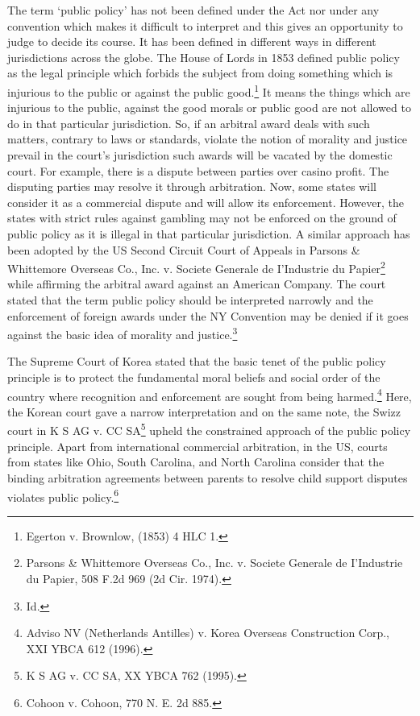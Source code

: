 \begin{multicols}{2}

\vspace{-.1cm}

\noi
The term ‘public policy’ has not been defined under the Act nor under any convention which
makes it difficult to interpret and this gives an opportunity to judge to decide its course. It has
been defined in different ways in different jurisdictions across the globe. The House of Lords
in 1853 defined public policy as the legal principle which forbids the subject from doing
something which is injurious to the public or against the public good.\footnote{Egerton v. Brownlow, (1853) 4 HLC 1.} It means the things which are injurious to the public, against the good morals or public good are not allowed to do in that particular jurisdiction. So, if an arbitral award deals with such matters, contrary to laws or standards, violate the notion of morality and justice prevail in the court’s jurisdiction
such awards will be vacated by the domestic court. For example, there is a dispute between
parties over casino profit. The disputing parties may resolve it through arbitration. Now, some
states will consider it as a commercial dispute and will allow its enforcement. However, the
states with strict rules against gambling may not be enforced on the ground of public policy
as it is illegal in that particular jurisdiction. A similar approach has been adopted by the US
Second Circuit Court of Appeals in Parsons \& Whittemore Overseas Co., Inc. v. Societe
Generale de I’Industrie du Papier\footnote{Parsons \& Whittemore Overseas Co., Inc. v. Societe Generale de I’Industrie du Papier, 508 F.2d 969 (2d Cir. 1974).} while affirming the arbitral award against an American Company. The court stated that the term public policy should be interpreted narrowly and the enforcement of foreign awards under the NY Convention may be denied if it goes against the basic idea of morality and justice.\footnote{Id.}

\vspace{-.1cm}

\noi
The Supreme Court of Korea stated that the basic tenet of the public policy principle is to
protect the fundamental moral beliefs and social order of the country where recognition and
enforcement are sought from being harmed.\footnote{Adviso NV (Netherlands Antilles) v. Korea Overseas Construction Corp., XXI YBCA 612 (1996).} Here, the Korean court gave a narrow
interpretation and on the same note, the Swizz court in K S AG v. CC SA\footnote{K S AG v. CC SA, XX YBCA 762 (1995).} upheld the constrained approach of the public policy principle. Apart from international commercial arbitration, in the US, courts from states like Ohio, South Carolina, and North Carolina consider that the binding arbitration agreements between parents to resolve child support disputes violates public policy.\footnote{Cohoon v. Cohoon, 770 N. E. 2d 885.}


\end{multicols}
